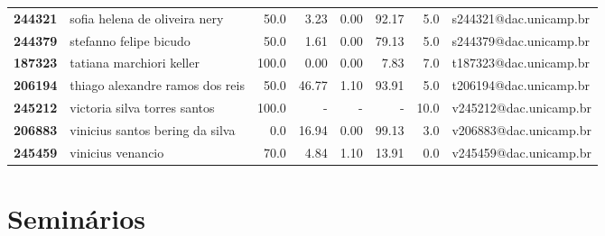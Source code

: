 \documentclass[11pt]{article}
\begin{document}
\begin{center}
\begin{landscape}
\begin{longtable}{llrrrrrl}
\textbf{244321} &         sofia helena de oliveira nery &                  50.0 &        3.23 &        0.00 &       92.17 &                      5.0 &  s244321@dac.unicamp.br \\
\textbf{244379} &                stefanno felipe bicudo &                  50.0 &        1.61 &        0.00 &       79.13 &                      5.0 &  s244379@dac.unicamp.br \\
\textbf{187323} &              tatiana marchiori keller &                 100.0 &        0.00 &        0.00 &        7.83 &                      7.0 &  t187323@dac.unicamp.br \\
\textbf{206194} &       thiago alexandre ramos dos reis &                  50.0 &       46.77 &        1.10 &       93.91 &                      5.0 &  t206194@dac.unicamp.br \\
\textbf{245212} &          victoria silva torres santos &                 100.0 &           - &           - &           - &                     10.0 &  v245212@dac.unicamp.br \\
\textbf{206883} &       vinicius santos bering da silva &                   0.0 &       16.94 &        0.00 &       99.13 &                      3.0 &  v206883@dac.unicamp.br \\
\textbf{245459} &                     vinicius venancio &                  70.0 &        4.84 &        1.10 &       13.91 &                      0.0 &  v245459@dac.unicamp.br \\
\end{longtable}
\end{landscape}\end{center}


\section{Seminários}
\label{sec:org3d8f9dd}
\end{document}
